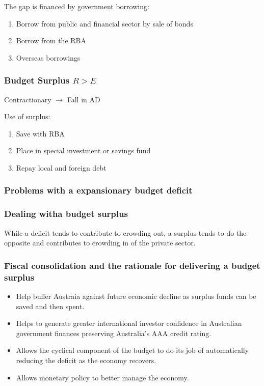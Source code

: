 \documentclass[11pt]{article}
\begin{document}
The gap is financed by government borrowing:

\begin{enumerate}
\item Borrow from public and financial sector by sale of bonds
\item Borrow from the RBA
\item Overseas borrowings
\end{enumerate}

\subsubsection{Budget Surplus $R > E$}
\label{sec-1-9-2}

Contractionary $\rightarrow$ Fall in AD

Use of surplus:

\begin{enumerate}
\item Save with RBA
\item Place in special investment or savings fund
\item Repay local and foreign debt
\end{enumerate}

\subsubsection{Problems with a expansionary budget deficit}
\label{sec-1-9-3}



\subsubsection{Dealing witha budget surplus}
\label{sec-1-9-4}

While a deficit tends to contribute to crowding out, a surplus tends
to do the opposite and contributes to crowding in of the private
sector.

\subsubsection{Fiscal consolidation and the rationale for delivering a budget surplus}
\label{sec-1-9-5}

\begin{itemize}
\item Help buffer Austraia against future economic decline as surplus
funds can be saved and then spent.
\item Helps to generate greater international investor confidence in
Australian government finances preserving Australia's AAA credit
rating.
\item Allows the cyclical component of the budget to do its job of
automatically reducing the deficit as the economy recovers.
\item Allows monetary policy to better manage the economy.
\end{itemize}
\end{document}
